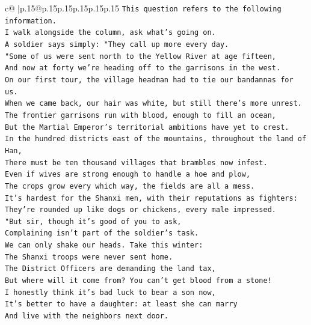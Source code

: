 \documentclass{article}
\begin{document}
{\begin{supertabular}{c@{$\;$}|p{.15\linewidth}@{}p{.15\linewidth}p{.15\linewidth}p{.15\linewidth}p{.15\linewidth}p{.15\linewidth}}
{{{\texttt{This question refers to the following information.} \\
\texttt{I walk alongside the column, ask what's going on.} \\
\texttt{A soldier says simply: "They call up more every day.} \\
\texttt{"Some of us were sent north to the Yellow River at age fifteen,} \\
\texttt{And now at forty we're heading off to the garrisons in the west.} \\
\texttt{On our first tour, the village headman had to tie our bandannas for us.} \\
\texttt{When we came back, our hair was white, but still there's more unrest.} \\
\texttt{The frontier garrisons run with blood, enough to fill an ocean,} \\
\texttt{But the Martial Emperor's territorial ambitions have yet to crest.} \\
\texttt{In the hundred districts east of the mountains, throughout the land of Han,} \\
\texttt{There must be ten thousand villages that brambles now infest.} \\
\texttt{Even if wives are strong enough to handle a hoe and plow,} \\
\texttt{The crops grow every which way, the fields are all a mess.} \\
\texttt{It's hardest for the Shanxi men, with their reputations as fighters:} \\
\texttt{They're rounded up like dogs or chickens, every male impressed.} \\
\texttt{"But sir, though it's good of you to ask,} \\
\texttt{Complaining isn't part of the soldier's task.} \\
\texttt{We can only shake our heads. Take this winter:} \\
\texttt{The Shanxi troops were never sent home.} \\
\texttt{The District Officers are demanding the land tax,} \\
\texttt{But where will it come from? You can't get blood from a stone!} \\
\texttt{I honestly think it's bad luck to bear a son now,} \\
\texttt{It's better to have a daughter: at least she can marry} \\
\texttt{And live with the neighbors next door.} \\
}}}
\end{supertabular}}
\end{document}
